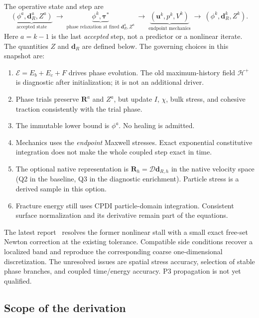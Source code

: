 \documentclass[11pt,a4paper]{article}
\newcommand{\tauv}{\bm\tau}
\newcommand{\R}{\bm R}
\newcommand{\Ecal}{\mathscr E}
\begin{document}
The operative state and step are
\begin{equation}
 \underbrace{(\phi^a,\bm d_R^a,Z^a)}_{\text{accepted state}}
 \ \longrightarrow\ 
 \underbrace{\phi^k,\tauv^*}_{\text{phase relaxation at fixed }\bm d_R^a,Z^a}
 \ \longrightarrow\ 
 \underbrace{(\bm u^k,p^k,V^k)}_{\text{endpoint mechanics}}
 \ \longrightarrow\ 
 (\phi^k,\bm d_R^k,Z^k).
 \label{eq:overview}
\end{equation}
Here $a=k-1$ is the last \emph{accepted} step, not a predictor or a nonlinear
iterate. The quantities $Z$ and $\bm d_R$ are defined below. The governing choices
in this snapshot are:
\begin{enumerate}
 \item $\Ecal=E_b+E_c+F$ drives phase evolution. The old maximum-history field
 $\mathcal H^+$ is diagnostic after initialization; it is not an additional driver.
 \item Phase trials preserve $\R^a$ and $Z^a$, but update $I$, $\chi$, bulk
 stress, and cohesive traction consistently with the trial phase.
 \item The immutable lower bound is $\phi^a$. No healing is admitted.
 \item Mechanics uses the \emph{endpoint} Maxwell stresses. Exact exponential
 constitutive integration does not make the whole coupled step exact in time.
 \item The optional native representation is $\R_h=\mathcal D\bm d_{R,h}$
 in the native velocity space (Q2 in the baseline, Q3 in the diagnostic
 enrichment). Particle stress is a derived sample in this option.
 \item Fracture energy still uses CPDI particle-domain integration. Consistent
 surface normalization and its derivative remain part of the equations.
\end{enumerate}

The latest report~\cite{localization} resolves the former nonlinear stall with
a small exact free-set Newton correction at the existing tolerance. Compatible
side conditions recover a localized band and reproduce the corresponding
coarse one-dimensional discretization. The unresolved issues are spatial stress
accuracy, selection of stable phase branches, and coupled time/energy accuracy.
P3 propagation is not yet qualified.

\subsection{Scope of the derivation}
\end{document}
